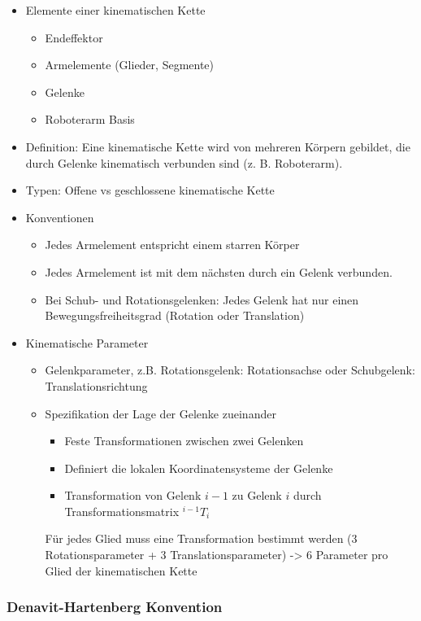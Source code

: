 \documentclass[paper=a4, fontsize=11pt]{scrartcl} %
\numberwithin{equation}{section} %
\numberwithin{figure}{section} %
\numberwithin{table}{section} %
\begin{document}
\begin{itemize}
\item Elemente einer kinematischen Kette
\begin{itemize}
\item Endeffektor
\item Armelemente (Glieder, Segmente)
\item Gelenke
\item Roboterarm Basis
\end{itemize}
\item Definition: Eine kinematische Kette wird von mehreren Körpern gebildet, die durch Gelenke kinematisch verbunden sind (z. B. Roboterarm).
\item Typen: Offene vs geschlossene kinematische Kette
\item Konventionen
\begin{itemize}
\item Jedes Armelement entspricht einem starren Körper
\item Jedes Armelement ist mit dem nächsten durch ein Gelenk verbunden.
\item Bei Schub- und Rotationsgelenken: Jedes Gelenk hat nur einen Bewegungsfreiheitsgrad (Rotation oder Translation)
\end{itemize}
\item Kinematische Parameter
\begin{itemize}
\item Gelenkparameter, z.B. Rotationsgelenk: Rotationsachse oder Schubgelenk: Translationsrichtung
\item Spezifikation der Lage der Gelenke zueinander
\begin{itemize}
\item Feste Transformationen zwischen zwei Gelenken
\item Definiert die lokalen Koordinatensysteme der Gelenke
\item Transformation von Gelenk $i-1$ zu Gelenk $i$ durch Transformationsmatrix $^{i-1}T_i$
\end{itemize}
Für jedes Glied muss eine Transformation bestimmt werden (3 Rotationsparameter + 3 Translationsparameter) -> 6 Parameter pro Glied der kinematischen Kette
\end{itemize}
\end{itemize}

\subsubsection{Denavit-Hartenberg Konvention}
\end{document}
